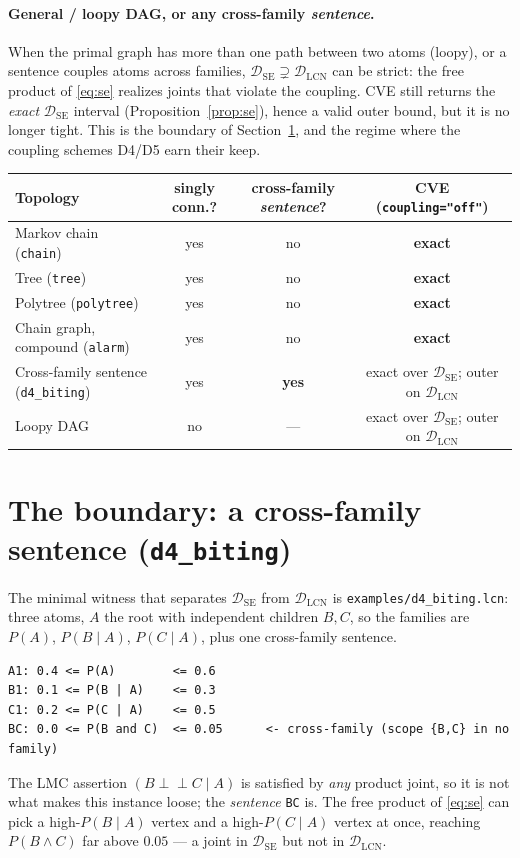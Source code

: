 \documentclass[11pt]{article}
\newcommand{\indep}{\perp\!\!\!\perp}
\newcommand{\DSE}{\mathcal{D}_{\mathrm{SE}}}
\newcommand{\DLCN}{\mathcal{D}_{\mathrm{LCN}}}
\begin{document}
\paragraph{General / loopy DAG, or any cross-family \emph{sentence}.} When the primal graph has more
than one path between two atoms (loopy), or a sentence couples atoms across families, $\DSE\supsetneq
\DLCN$ can be strict: the free product of \eqref{eq:se} realizes joints that violate the coupling.
CVE still returns the \emph{exact} $\DSE$ interval (Proposition~\ref{prop:se}), hence a valid outer
bound, but it is no longer tight. This is the boundary of Section~\ref{sec:boundary}, and the regime
where the coupling schemes D4/D5 earn their keep.

\begin{center}\small
\begin{tabular}{lccc}
\toprule
Topology & singly conn.? & cross-family \emph{sentence}? & CVE (\texttt{coupling="off"}) \\
\midrule
Markov chain (\texttt{chain})     & yes & no  & \textbf{exact} \\
Tree (\texttt{tree})              & yes & no  & \textbf{exact} \\
Polytree (\texttt{polytree})      & yes & no  & \textbf{exact} \\
Chain graph, compound (\texttt{alarm}) & yes & no  & \textbf{exact} \\
Cross-family sentence (\texttt{d4\_biting}) & yes & \textbf{yes} & exact over $\DSE$; outer on $\DLCN$ \\
Loopy DAG                          & no  & --- & exact over $\DSE$; outer on $\DLCN$ \\
\bottomrule
\end{tabular}
\end{center}

\section{The boundary: a cross-family sentence (\texttt{d4\_biting})}\label{sec:boundary}

The minimal witness that separates $\DSE$ from $\DLCN$ is \texttt{examples/d4\_biting.lcn}: three
atoms, $A$ the root with independent children $B,C$, so the families are $P(A)$, $P(B\mid A)$,
$P(C\mid A)$, plus one cross-family sentence.
\begin{center}\small
\begin{verbatim}
A1: 0.4 <= P(A)        <= 0.6
B1: 0.1 <= P(B | A)    <= 0.3
C1: 0.2 <= P(C | A)    <= 0.5
BC: 0.0 <= P(B and C)  <= 0.05      <- cross-family (scope {B,C} in no family)
\end{verbatim}
\end{center}
The LMC assertion $(B\indep C\mid A)$ is satisfied by \emph{any} product joint, so it is not what
makes this instance loose; the \emph{sentence} \texttt{BC} is. The free product of \eqref{eq:se} can
pick a high-$P(B\mid A)$ vertex and a high-$P(C\mid A)$ vertex at once, reaching $P(B\land C)$ far
above $0.05$ --- a joint in $\DSE$ but not in $\DLCN$.
\end{document}
